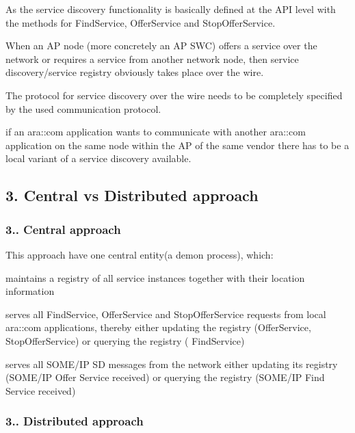 \begin{DoxyItemize}
\item As the service discovery functionality is basically defined at the A\+PI level with the methods for Find\+Service, Offer\+Service and Stop\+Offer\+Service.
\item When an AP node (more concretely an AP S\+WC) offers a service over the network or requires a service from another network node, then service discovery/service registry obviously takes place over the wire.
\item The protocol for service discovery over the wire needs to be completely specified by the used communication protocol.
\item if an ara\+::com application wants to communicate with another ara\+::com application on the same node within the AP of the same vendor there has to be a local variant of a service discovery available.
\end{DoxyItemize}

\subsection*{3. Central vs Distributed approach}

\subsubsection*{3.. Central approach}


\begin{DoxyItemize}
\item This approach have one central entity(a demon process), which\+:
\begin{DoxyItemize}
\item maintains a registry of all service instances together with their location information
\item serves all Find\+Service, Offer\+Service and Stop\+Offer\+Service requests from local ara\+::com applications, thereby either updating the registry (Offer\+Service, Stop\+Offer\+Service) or querying the registry ( Find\+Service)
\item serves all S\+O\+M\+E/\+IP SD messages from the network either updating its registry (S\+O\+M\+E/\+IP Offer Service received) or querying the registry (S\+O\+M\+E/\+IP Find Service received) 
\end{DoxyItemize}
\end{DoxyItemize}

\subsubsection*{3.. Distributed approach}


